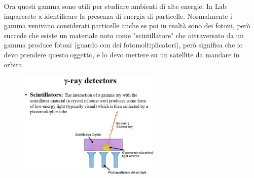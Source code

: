 \documentclass[a4paper,11pt]{article}
\begin{document}
Ora questi gamma sono utili per studiare ambienti di alte energie. In Lab imparerete a identificare la presenza di energia di particelle. Normalmente i gamma venivano considerati particelle anche se poi in realtà sono dei fotoni, però succede che esiste un materiale noto come "scintillatore" che attraversato da un gamma produce fotoni (guardo con dei fotomoltiplicatori), però significa che io devo prendere questo oggetto, e lo devo mettere su un satellite da mandare in orbita. 

\begin{figure}[h!!]
        \centering
        \includegraphics[width=7cm]{38.jpg}
        \label{}
    \end{figure}
\end{document}
